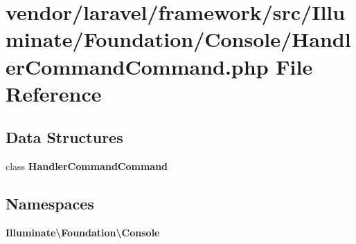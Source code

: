 \section{vendor/laravel/framework/src/\+Illuminate/\+Foundation/\+Console/\+Handler\+Command\+Command.php File Reference}
\label{_handler_command_command_8php}
\subsection*{Data Structures}
\begin{DoxyCompactItemize}
\item 
class {\bf Handler\+Command\+Command}
\end{DoxyCompactItemize}
\subsection*{Namespaces}
\begin{DoxyCompactItemize}
\item 
 {\bf Illuminate\textbackslash{}\+Foundation\textbackslash{}\+Console}
\end{DoxyCompactItemize}
